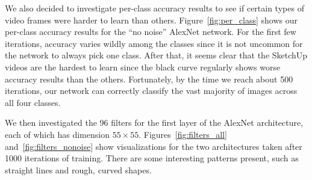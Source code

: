 \documentclass[10pt]{article}
\begin{document}
We also decided to investigate per-class accuracy results to see if certain types of video frames
were harder to learn than others. Figure~\ref{fig:per_class} shows our per-class accuracy results
for the ``no noise'' AlexNet network. For the first few iterations, accuracy varies wildly among the
classes since it is not uncommon for the network to always pick one class. After that, it seems
clear that the SketchUp videos are the hardest to learn since the black curve regularly shows worse
accuracy results than the others. Fortunately, by the time we reach about 500 iterations, our
network can correctly classify the vast majority of images across all four classes.

We then investigated the 96 filters for the first layer of the AlexNet architecture, each of which
has dimension $55\times 55$. Figures~\ref{fig:filters_all} and~\ref{fig:filters_nonoise} show
visualizations for the two architectures taken after 1000 iterations of training. There are some
interesting patterns present, such as straight lines and rough, curved shapes.
\end{document}
